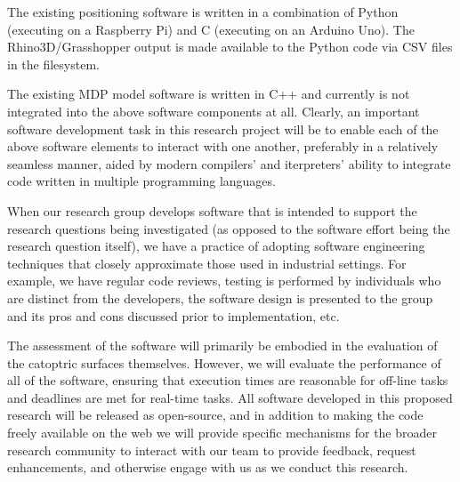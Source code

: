 The existing positioning software is written in a combination of
Python (executing on a Raspberry Pi) and C (executing on an Arduino Uno).
The Rhino3D/Grasshopper output is made available to the Python code via CSV
files in the filesystem.

The existing MDP model software is written in C++ and currently is not integrated
into the above software components at all.
Clearly, an important software development task in this research project
will be to enable each of the above software elements to interact with one
another, preferably in a relatively seamless manner, aided by modern compilers'
and iterpreters' ability to integrate code written in multiple programming
languages.

When our research group develops software that is intended to support
the research questions being investigated (as opposed to the software
effort being the research question itself), we have a practice of adopting
software engineering techniques that closely approximate those used
in industrial settings.  For example, we have regular code reviews,
testing is performed by individuals who are distinct from the developers,
the software design is presented to the group and its pros and cons
discussed prior to implementation, etc.

The assessment of the software will primarily be embodied in the evaluation
of the catoptric surfaces themselves.  However, we will evaluate the
performance of all of the software, ensuring that execution times are
reasonable for off-line tasks and deadlines are met for real-time tasks.
All software developed in this proposed research will be released as open-source,
and in addition to making the code freely available on the web we will provide
specific mechanisms for the broader research community to interact with our
team to provide feedback, request enhancements, and otherwise engage with
us as we conduct this research.
